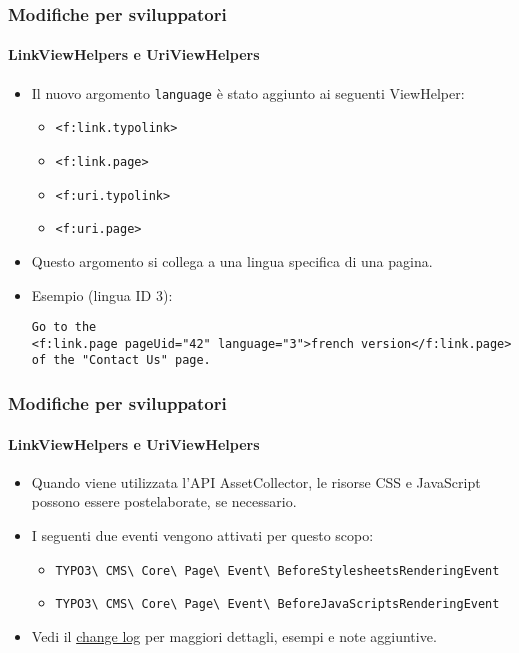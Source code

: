 \begin{frame}[fragile]
	\frametitle{Modifiche per sviluppatori}
	\framesubtitle{LinkViewHelpers e UriViewHelpers}

	\lstset{basicstyle=\tiny\ttfamily}

	\begin{itemize}
		\item Il nuovo argomento \texttt{language} è stato aggiunto ai seguenti ViewHelper:
			\begin{itemize}
				\item \texttt{<f:link.typolink>}
				\item \texttt{<f:link.page>}
				\item \texttt{<f:uri.typolink>}
				\item \texttt{<f:uri.page>}
			\end{itemize}

		\item Questo argomento si collega a una lingua specifica di una pagina.
		\item Esempio (lingua ID 3):
\begin{lstlisting}
Go to the
<f:link.page pageUid="42" language="3">french version</f:link.page>
of the "Contact Us" page.
\end{lstlisting}

	\end{itemize}

\end{frame}


\begin{frame}[fragile]
	\frametitle{Modifiche per sviluppatori}
	\framesubtitle{LinkViewHelpers e UriViewHelpers}

	\begin{itemize}
		\item Quando viene utilizzata l'API AssetCollector, le risorse CSS
		    e JavaScript possono essere postelaborate, se necessario.
		\item I seguenti due eventi vengono attivati per questo scopo:
			\begin{itemize}\smaller
				\item \texttt{TYPO3\textbackslash
					CMS\textbackslash
					Core\textbackslash
					Page\textbackslash
					Event\textbackslash
					BeforeStylesheetsRenderingEvent}
				\item \texttt{TYPO3\textbackslash
					CMS\textbackslash
					Core\textbackslash
					Page\textbackslash
					Event\textbackslash
					BeforeJavaScriptsRenderingEvent}
			\end{itemize}

		\item Vedi il
			\href{https://docs.typo3.org/c/typo3/cms-core/master/en-us/Changelog/10.4/Feature-90899-IntroduceAssetPreRenderingEvents.html}{change log}
			per maggiori dettagli, esempi e note aggiuntive.
	\end{itemize}

\end{frame}

